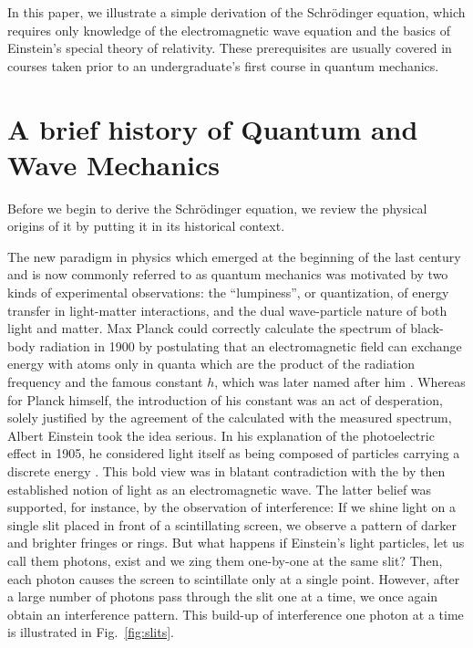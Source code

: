 \documentclass[preprint,footinbib,preprintnumbers,amsmath,amssymb,prb,12pt]{revtex4}
\begin{document}
In this paper, we illustrate a simple
derivation of the Schr\"{o}dinger equation, which requires only
knowledge of the electromagnetic wave equation and the basics of
Einstein's special theory of relativity. These prerequisites are
usually covered in courses taken prior to an undergraduate's first
course in quantum mechanics.

\section{A brief history of Quantum and Wave Mechanics}

Before we begin to derive the Schr\"{o}dinger equation, we review the physical
origins of it by putting it in its historical
context.

The new paradigm in physics which emerged at the beginning of the
last century and is now commonly referred to as quantum mechanics
was motivated by two kinds of experimental observations: the
``lumpiness'', or quantization, of energy transfer in light-matter
interactions, and the dual wave-particle nature of both light and
matter. Max Planck could correctly calculate the spectrum of
black-body radiation in 1900 by postulating that an electromagnetic
field can exchange energy with atoms only in quanta which are the
product of the radiation frequency and the famous constant $h$,
which was later named after him \cite{planck}. Whereas for Planck himself, the
introduction of his constant was an act of desperation, solely
justified by the agreement of the calculated with the measured
spectrum, Albert Einstein took the idea serious. In his explanation
of the photoelectric effect in 1905, he considered light itself as
being composed of particles carrying a discrete energy \cite{einstein}. This bold
view was in blatant contradiction with the by then established
notion of light as an electromagnetic wave. The latter belief was
supported, for instance, by the observation of interference: If we
shine light on a single slit placed in front of a scintillating
screen, we observe a pattern of darker and brighter fringes or
rings. But what happens if Einstein's light particles, let us call
them photons, exist and we zing them one-by-one at the same slit?
Then, each photon causes the screen to scintillate only at a single
point. However, after a large number of photons pass through the
slit one at  a time, we once again obtain an interference pattern. This build-up of interference one photon at a time is illustrated in Fig.~\ref{fig:slits}.
\end{document}
